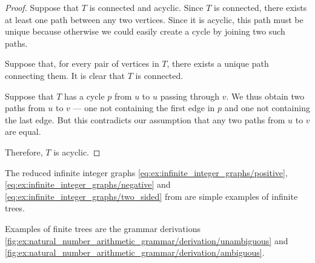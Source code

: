 \begin{proof}
   Suppose that \( T \) is connected and acyclic. Since \( T \) is connected, there exists at least one path between any two vertices. Since it is acyclic, this path must be unique because otherwise we could easily create a cycle by joining two such paths.

   Suppose that, for every pair of vertices in \( T \), there exists a unique path connecting them. It is clear that \( T \) is connected.

  Suppose that \( T \) has a cycle \( p \) from \( u \) to \( u \) passing through \( v \). We thus obtain two paths from \( u \) to \( v \) --- one not containing the first edge in \( p \) and one not containing the last edge. But this contradicts our assumption that any two paths from \( u \) to \( v \) are equal.

  Therefore, \( T \) is acyclic.
\end{proof}

\begin{example}\label{ex:def:tree}
  The reduced infinite integer graphs \eqref{eq:ex:infinite_integer_graphs/positive}, \eqref{eq:ex:infinite_integer_graphs/negative} and \eqref{eq:ex:infinite_integer_graphs/two_sided} from  are simple examples of infinite trees.

  Examples of finite trees are the grammar derivations \cref{fig:ex:natural_number_arithmetic_grammar/derivation/unambiguous} and \cref{fig:ex:natural_number_arithmetic_grammar/derivation/ambiguous}.
\end{example}

